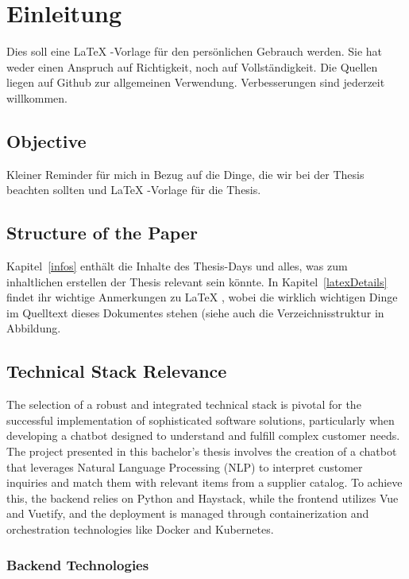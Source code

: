 \section{Einleitung}
Dies soll eine \LaTeX{}
-Vorlage für den persönlichen Gebrauch werden.
Sie hat weder einen Anspruch auf Richtigkeit, noch auf Vollständigkeit.
Die Quellen liegen auf Github zur allgemeinen Verwendung.
Verbesserungen sind jederzeit willkommen.

\subsection{Objective}
Kleiner Reminder für mich in Bezug auf die Dinge, die wir bei der Thesis beachten sollten und \LaTeX{}
-Vorlage für die Thesis.\autocite{syedQuestionAnsweringChatbot2021}

\subsection{Structure of the Paper}
Kapitel~\ref{infos}
enthält die Inhalte des Thesis-Days und alles, was zum inhaltlichen erstellen der Thesis relevant sein könnte.
In
Kapitel~\ref{latexDetails}~ findet ihr wichtige Anmerkungen zu \LaTeX{}
, wobei die wirklich wichtigen Dinge im Quelltext dieses Dokumentes stehen (siehe auch die Verzeichnisstruktur in
Abbildung.

\subsection{Technical Stack Relevance}

The selection of a robust and integrated technical stack is pivotal for the successful implementation of sophisticated
software solutions, particularly when developing a chatbot designed to understand and fulfill complex customer needs.
The project presented in this bachelor’s thesis involves the creation of a chatbot that leverages Natural Language
Processing (NLP) to interpret customer inquiries and match them with relevant items from a supplier catalog.
To achieve
this, the backend relies on Python and Haystack, while the frontend utilizes Vue and Vuetify, and the deployment is
managed through containerization and orchestration technologies like Docker and Kubernetes.




\subsubsection{Backend Technologies}

